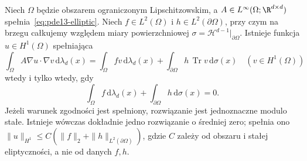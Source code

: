 \begin{twierdzenie}
\label{thm:pde13-neumann}
Niech $\Omega$ będzie obszarem ograniczonym Lipschitzowskim, a $A\in L^\infty(\Omega;\R^{d\times d})$
spełnia~\eqref{eq:pde13-elliptic}. Niech
$f\in L^2(\Omega)$ i $h\in L^2(\partial\Omega)$,
przy czym na brzegu całkujemy względem miary powierzchniowej
$\sigma=\mathcal H^{d-1}|_{\partial\Omega}$.
Istnieje funkcja $u\in H^1(\Omega)$ spełniająca
\begin{equation}\label{eq:pde13-neumann}
\int_\Omega A\nabla u\cdot\nabla v\,\mathrm d\lambda_d(x)
=\int_\Omega fv\,\mathrm d\lambda_d(x)
+\int_{\partial\Omega} h\,\operatorname{Tr}v\,\mathrm d\sigma(x)
\quad(v\in H^1(\Omega))
\end{equation}
wtedy i tylko wtedy, gdy
\begin{equation}\label{eq:pde13-neumann-comp}
\int_\Omega f\,\mathrm d\lambda_d(x)
+\int_{\partial\Omega}h\,\mathrm d\sigma(x)=0.
\end{equation}
Jeżeli warunek zgodności jest spełniony, rozwiązanie jest
jednoznaczne modulo stałe. Istnieje wówczas dokładnie
jedno rozwiązanie o średniej zero; spełnia ono
$\|u\|_{H^1}\leq C(\|f\|_2+\|h\|_{L^2(\partial\Omega)})$,
gdzie $C$ zależy od obszaru i stałej eliptyczności, a nie
od danych $f,h$.
\end{twierdzenie}
